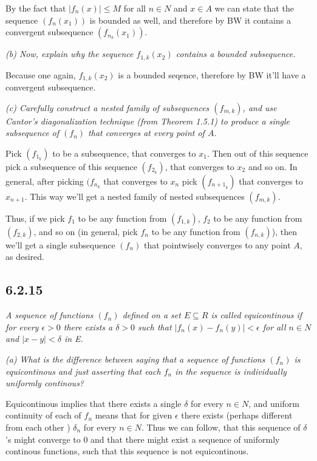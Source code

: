 \documentclass[11pt,oneside,titlepage]{book}
\begin{document}
By the fact that $|f_n(x)| \leq M$ for all $n \in N$ and $x \in A$
we can state that the sequence $(f_n(x_1))$ is bounded as well, and therefore
by BW it contains a convergent subsequence $(f_{n_k}(x_1))$.

\textit{(b) Now, explain why the sequence $f_{1, k}(x_2)$ contains a
  bounded subsequence.}

Because one again, $f_{1, k}(x_2)$ is a bounded seqence, therefore by BW it'll
have a convergent subsequence.

\textit{(c) Carefully construct a nested family of subsequences $(f_{m,k})$,
  and use Cantor's diagonalization technique (from Theorem 1.5.1) to
  produce a single subsequence of $(f_n)$ that converges at every point of
  $A$.}

Pick $(f_{1_k})$ to be a subsequence, that converges
to $x_1$.
Then out of this sequence  pick a subsequence
of this sequence $(f_{2_k})$, that converges to $x_2$
and so on. In general, after picking $(f_{n_k}$ that converges to $x_n$ pick
$(f_{{n + 1}_k})$ that converges to $x_{n + 1}$. This way we'll get a
nested family of nested subsequences $(f_{m, k})$.

Thus, if we pick $f_1$ to be any function from $(f_{1, k})$,
$f_2$ to be any function from $(f_{2, k})$, and so on
(in general, pick  $f_n$ to be any function from $(f_{n, k})$), then we'll
get a single subsequence $(f_n)$ that pointwisely converges to any
point $A$, as desired.

\subsection*{6.2.15}
\textit{A sequence of functions $(f_n)$ defined on a set $E \subseteq R$ is
  called equicontinous if for every $\epsilon > 0$ there exists a $\delta > 0$
  such that $|f_n(x) - f_n(y)| < \epsilon$ for all $n \in N$ and
  $|x - y| < \delta$ in E.}

\textit{(a) What is the difference between saying that a sequence of
  functions $(f_n)$ is equicontinous and just asserting that each $f_n$ in the
  sequence is individually uniformly continous?}

Equicontinous implies that there exists a single $\delta$ for every $n \in N$,
and uniform continuity of each of $f_n$ means that for given  $\epsilon$
there exists (perhaps different from each other ) $\delta_n$ for
every $n \in N$. Thus we can follow, that  this sequence of $\delta$'s
might converge to 0 and that there might exist a sequence of
uniformly continous functions, such that this sequence is not
equicontinous.
\end{document}
